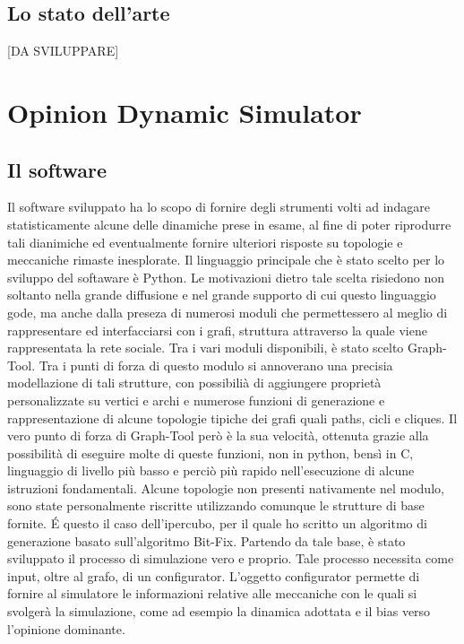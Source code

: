 \documentclass{article}
\begin{document}
\subsection{Lo stato dell'arte}
[DA SVILUPPARE] 

\section{Opinion Dynamic Simulator}
\subsection{Il software}
Il software sviluppato ha lo scopo di fornire degli strumenti volti ad indagare statisticamente alcune delle dinamiche prese in esame, al fine di poter riprodurre tali dianimiche ed eventualmente fornire ulteriori risposte su topologie e meccaniche rimaste inesplorate.\newline
Il linguaggio principale che è stato scelto per lo sviluppo del softaware è Python. Le motivazioni dietro tale scelta risiedono non soltanto nella grande diffusione e nel grande supporto di cui questo linguaggio gode, ma anche dalla preseza di numerosi moduli che permettessero al meglio di rappresentare ed interfacciarsi con i grafi, struttura attraverso la quale viene rappresentata la rete sociale.
Tra i vari moduli disponibili, è stato scelto Graph-Tool. Tra i punti di forza di questo modulo si annoverano una precisia modellazione di tali strutture, con possibilià di aggiungere proprietà personalizzate su vertici e archi e numerose funzioni di generazione e rappresentazione di alcune topologie tipiche dei grafi quali paths, cicli e cliques. Il vero punto di forza di Graph-Tool però è la sua velocità, ottenuta grazie alla possibilità di eseguire molte di queste funzioni, non in python, bensì in C, linguaggio di livello più basso e perciò più rapido nell'esecuzione di alcune istruzioni fondamentali.\newline
Alcune topologie non presenti nativamente nel modulo, sono state personalmente riscritte utilizzando comunque le strutture di base fornite. É questo il caso dell'ipercubo, per il quale ho scritto un algoritmo di generazione basato sull'algoritmo Bit-Fix.\newline
Partendo da tale base, è stato sviluppato il processo di simulazione vero e proprio. Tale processo necessita come input, oltre al grafo, di un configurator. L'oggetto configurator permette di fornire al simulatore le informazioni relative alle meccaniche con le quali si svolgerà la simulazione, come ad esempio la dinamica adottata e il bias verso l'opinione dominante.\newline 
\end{document}
